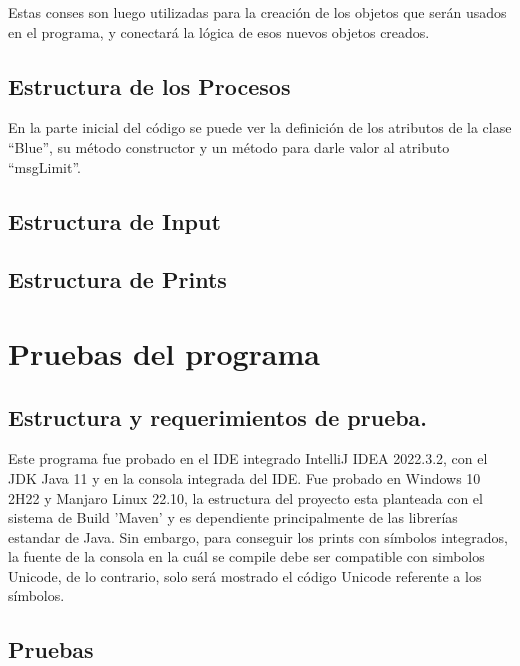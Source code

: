 \documentclass[a4paper]{article}
\begin{document}
    Estas conses son luego utilizadas para la creación de los objetos
    que serán usados en el programa, y conectará la lógica de esos
    nuevos objetos creados. 

    \subsection{Estructura de los Procesos}
    En la parte inicial del código se puede ver la definición de los atributos de la clase “Blue”, su método constructor y un método para darle valor al atributo “msgLimit”. 
    \subsection{Estructura de Input}
    
    \subsection{Estructura de Prints}
    

\section{Pruebas del programa}

\subsection{Estructura y requerimientos de prueba.}
Este programa fue probado en el IDE integrado IntelliJ IDEA 2022.3.2, con
el JDK Java 11 y en la consola integrada del IDE. Fue probado en Windows 10 
2H22 y Manjaro Linux 22.10, la estructura del proyecto esta planteada con el
sistema de Build 'Maven' y es dependiente principalmente de las librerías estandar
de Java. Sin embargo, para conseguir los prints con símbolos integrados, la fuente
de la consola en la cuál se compile debe ser compatible con simbolos Unicode,
de lo contrario, solo será mostrado el código Unicode referente a los símbolos.

\subsection{Pruebas}
\end{document}
